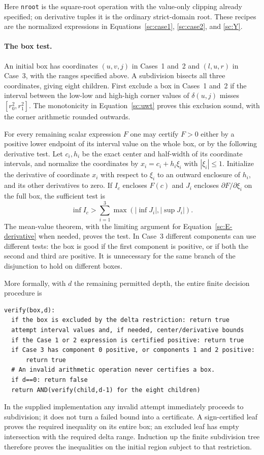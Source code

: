 Here \texttt{nroot} is the square-root operation with the value-only
clipping already specified; on derivative tuples it is the ordinary
strict-domain root.  These recipes are the normalized expressions in
Equations~\eqref{sc:case1}, \eqref{sc:case2}, and \eqref{sc:Y}.

\paragraph{The box test.}
An initial box has coordinates $(u,v,j)$ in Cases~1 and~2 and
$(l,u,r)$ in Case~3, with the ranges specified above.
A subdivision bisects all three coordinates, giving eight children.
First exclude a box in Cases~1 and~2 if the interval between the low-low
and high-high corner values of $\delta(u,j)$ misses $[r_0^2,r_1^2]$.
The monotonicity in Equation~\eqref{sc:uwt} proves this exclusion sound, with the
corner arithmetic rounded outwards.

For every remaining scalar expression $F$ one may certify $F>0$ either
by a positive lower endpoint of its interval value on the whole box, or
by the following derivative test.  Let $c_i,h_i$ be the exact center and
half-width of its coordinate intervals, and normalize the coordinates by
$x_i=c_i+h_i\xi_i$ with $|\xi_i|\leq1$.  Initialize the derivative of
coordinate $x_i$ with respect to $\xi_i$ to an outward enclosure of $h_i$,
and its other derivatives to zero.  If $I_c$ encloses $F(c)$ and $J_i$
encloses $\partial F/\partial\xi_i$ on the full box, the sufficient test is
\begin{equation}\label{sc:center-test}
 \inf I_c>\sum_{i=1}^3\max(|\inf J_i|,|\sup J_i|).
\end{equation}
The mean-value theorem, with the limiting argument for
Equation~\eqref{sc:E-derivative} when needed, proves the test.
In Case~3 different components can use different tests: the box is good
if the first component is positive, or if both the second and third are
positive.  It is unnecessary for the same branch of the disjunction to
hold on different boxes.

More formally, with $d$ the remaining permitted depth, the entire
finite decision procedure is
\begin{verbatim}
verify(box,d):
  if the box is excluded by the delta restriction: return true
  attempt interval values and, if needed, center/derivative bounds
  if the Case 1 or 2 expression is certified positive: return true
  if Case 3 has component 0 positive, or components 1 and 2 positive:
      return true
  # An invalid arithmetic operation never certifies a box.
  if d==0: return false
  return AND(verify(child,d-1) for the eight children)
\end{verbatim}
In the supplied implementation any invalid attempt immediately proceeds
to subdivision; it does not turn a failed bound into a certificate.
A sign-certified leaf proves the required inequality on its entire box;
an excluded leaf has empty intersection with the required delta range.
Induction up the finite subdivision tree therefore proves the inequalities
on the initial region subject to that restriction.

